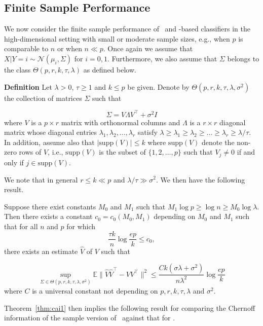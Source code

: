 \documentclass[11pt]{extarticle}
\begin{document}
\subsection{Finite Sample Performance}
We now consider the finite sample performance of \Lol~and \Pca-based classifiers in the high-dimensional setting with small or moderate sample sizes, e.g., when $p$ is comparable to $n$ or when $n \ll p$. Once again we assume that $X | Y = i \sim \mathcal{N}(\mu_i, \Sigma)$ for $i = 0, 1$. Furthermore, we also assume that $\Sigma$ belongs to the class $\Theta(p,r,k,\tau,\lambda)$ as defined below.

{\bf Definition} Let $\lambda > 0$, $\tau \geq 1$ and $k \leq p$ be given. Denote by $\Theta(p,r,k,\tau,\lambda,\sigma^2)$ the collection of matrices $\Sigma$ such that

$$ \Sigma = V \Lambda V^{\top} + \sigma^2 I $$
where $V$ is a $p \times r$  matrix with orthonormal columns and $\Lambda$ is a $r \times r$ diagonal matrix whose diagonal entries $\lambda_1, \lambda_2, \dots, \lambda_r$ satisfy $\lambda \geq \lambda_1 \geq \lambda_2 \geq \dots \geq \lambda_r \geq \lambda/\tau$. In addition, assume also that $|\mathrm{supp}(V)| \leq k$ where $\mathrm{supp}(V)$ denote the non-zero rows of $V$, i.e., $\mathrm{supp}(V)$ is the subset of $\{1,2,\dots,p\}$ such that $V_j \not = 0$ if and only if $j \in \mathrm{supp}(V)$.

We note that in general $r \leq k \ll p$ and $\lambda/\tau \gg \sigma^2$. We then have the following result.

\begin{thm}
\label{thm:cai1}
Suppose there exist constants $M_0$ and $M_1$ such that $M_1 \log p \geq \log n \geq M_0 \log \lambda$. Then there exists a constant $c_0 = c_0(M_0, M_1)$ depending on $M_0$ and $M_1$ such that for all $n$ and $p$ for which
$$ \frac{\tau k}{n} \log \frac{e p}{k} \leq c_0, $$ there exists an estimate $\hat{V}$ of $V$ such that

\begin{equation}
\label{eq:cai1} \sup_{\Sigma \in \Theta(p,r,k,\tau,\lambda,\sigma^2)} \mathbb{E} \|\hat{V} \hat{V}^{\top} - V V^{\top} \|^{2} \leq \frac{C k (\sigma \lambda + \sigma^2)}{n \lambda^{2}} \log \frac{e p}{k}
\end{equation}
where $C$ is a universal constant not depending on $p,r,k,\tau,\lambda$ and $\sigma^2$.
\end{thm}

Theorem~\ref{thm:cai1} then implies the following result for comparing the Chernoff information of the sample version of \Lol~against that for \Pca.
\end{document}
